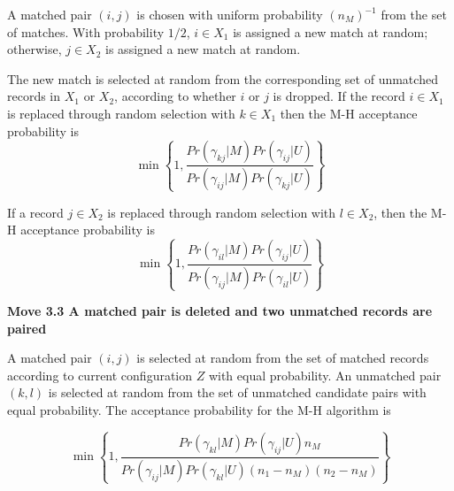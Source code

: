 \documentclass[11pt,reqno]{amsart}
\begin{document}
A matched pair $(i,j)$ is chosen with uniform probability $(n_M)^{-1}$ from the set of matches.  With probability $1/2$, $i\in X_1$ is assigned a new match at random; otherwise, $j\in X_2$ is assigned a new match at random.

The new match is selected at random from the corresponding set of unmatched records in $X_1$ or $X_2$, according to whether $i$ or $j$ is dropped.   If the record $i \in X_1$ is replaced through random selection with $k \in X_1$ then the M-H acceptance probability is
\[ \min \left\{ 1, \frac{Pr(\gamma_{kj} | M) Pr(\gamma_{ij} | U)}{Pr(\gamma_{ij}| M) Pr(\gamma_{kj} | U)} \right\} \]

If a record $j\in X_2$ is replaced through random selection with $l \in X_2$, then the M-H acceptance probability is 
\[ \min \left\{1, \frac{Pr(\gamma_{il} | M) Pr(\gamma_{ij} | U)}{Pr(\gamma_{ij} | M) Pr(\gamma_{il} | U)} \right\} \]

\textbf{Move 3.3 A matched pair is deleted and two unmatched records are paired}

A matched pair $(i,j)$ is selected at random from the set of matched records according to current configuration $Z$ with equal probability.  An unmatched pair $(k,l)$ is selected at random from the set of unmatched candidate pairs with equal probability.   The acceptance probability for the M-H algorithm is

\[ \min \left\{1,  \frac{Pr(\gamma_{kl} | M)Pr(\gamma_{ij} | U) n_M}{Pr(\gamma_{ij} | M) Pr(\gamma_{kl} | U) (n_1 - n_M)(n_2 - n_M)} \right\} \]
\end{document}
